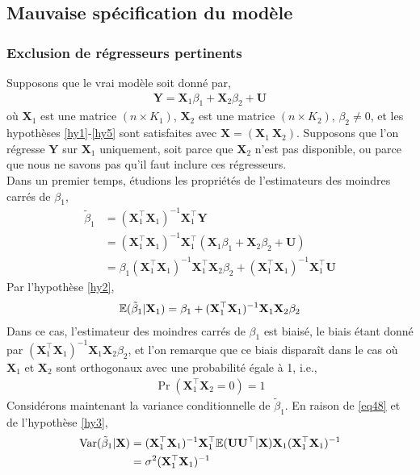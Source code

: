 \subsection{Mauvaise spécification du modèle}
\subsubsection*{Exclusion de régresseurs pertinents}
Supposons que le vrai modèle soit donné par,
\begin{align}
\mathbf{Y} = \mathbf{X}_1\beta_1 + \mathbf{X}_2\beta_2 + \mathbf{U}
\label{eq49}
\end{align}
où $\mathbf{X}_1$ est une matrice $(n\times K_1)$, $\mathbf{X}_2$ est une matrice $(n\times K_2)$, $\beta_2\neq 0$, et les hypothèses \ref{hy1}-\ref{hy5} sont satisfaites avec $\mathbf{X} = (\mathbf{X}_1 \ \mathbf{X}_2)$. Supposons que l'on régresse $\mathbf{Y}$ sur $\mathbf{X}_1$ uniquement, soit parce que $\mathbf{X}_2$ n'est pas disponible, ou parce que nous ne savons pas qu'il faut inclure ces régresseurs.\\
Dans un premier temps, étudions les propriétés de l'estimateurs des moindres carrés de $\beta_1$,
\begin{align*}
\tilde{\beta}_1 &= (\mathbf{X}_1^\top\mathbf{X}_1)^{-1}\mathbf{X}_1^\top\mathbf{Y}\\
&= (\mathbf{X}_1^\top\mathbf{X}_1)^{-1}\mathbf{X}_1^\top(\mathbf{X}_1\beta_1 + \mathbf{X}_2\beta_2+\mathbf{U})\\
&=\beta_1(\mathbf{X}_1^\top\mathbf{X}_1)^{-1}\mathbf{X}_1^\top\mathbf{X}_2\beta_2 + 
(\mathbf{X}_1^\top\mathbf{X}_1)^{-1}\mathbf{X}_1^\top\mathbf{U}
\end{align*}
Par l'hypothèse \ref{hy2},
\begin{align}
\mathbb{E}(\tilde{\beta}_1 | \mathbf{X}_1) = \beta_1 + (\mathbf{X}_1^\top\mathbf{X}_1)^{-1}\mathbf{X}_1\mathbf{X}_2\beta_2
\label{eq48}
\end{align}
Dans ce cas, l'estimateur des moindres carrés de $\beta_1$ est biaisé, le biais étant donné par $(\mathbf{X}_1^\top\mathbf{X}_1)^{-1}\mathbf{X}_1\mathbf{X}_2\beta_2$, et l'on remarque que ce biais disparaît dans le cas où $\mathbf{X}_1$ et $\mathbf{X}_2$ sont orthogonaux avec une probabilité égale à 1, i.e.,
\begin{align*}
\Pr(\mathbf{X}_1^\top\mathbf{X}_2 = 0) = 1
\end{align*}
Considérons maintenant la variance conditionnelle de $\tilde{\beta}_1$. En raison de \eqref{eq48} et de l'hypothèse \ref{hy3},
\begin{align*}
\mathrm{Var}(\tilde{\beta}_1 | \mathbf{X}) & = (\mathbf{X}_1^\top\mathbf{X}_1)^{-1}\mathbf{X}_1^\top\mathbb{E}(\mathbf{U}\mathbf{U}^\top|\mathbf{X})\mathbf{X}_1(\mathbf{X}_1^\top\mathbf{X}_1)^{-1}\\
&=\sigma^2(\mathbf{X}_1^\top\mathbf{X}_1)^{-1}
\end{align*}
